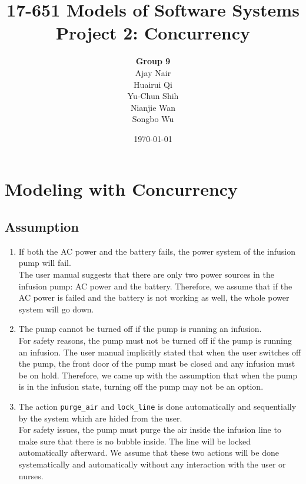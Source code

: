 \documentclass[titlepage]{article}
\begin{document}
\title{17-651 Models of Software Systems\\[1ex] Project 2: Concurrency}
\author{
{\Large\textbf{Group 9}}\\[3ex]
Ajay Nair\\[1ex] Huairui Qi\\[1ex] Yu-Chun Shih\\[1ex] Nianjie Wan\\[1ex]Songbo Wu}
\date{\today}
\maketitle

\section{Modeling with Concurrency}

    \subsection{Assumption}
    \begin{enumerate}
        \item If both the AC power and the battery fails, the power system of the infusion pump will fail.\\
        The user manual suggests that there are only two power sources in the infusion pump: AC power and the battery. Therefore, we assume that if the AC power is failed and the battery is not working as well, the whole power system will go down.
        \item The pump cannot be turned off if the pump is running an infusion.\\
        For safety reasons, the pump must not be turned off if the pump is running an infusion. The user manual implicitly stated that when the user switches off the pump, the front door of the pump must be closed and any infusion must be on hold. Therefore, we came up with the assumption that when the pump is in the infusion state, turning off the pump may not be an option.
        \item The action \texttt{purge\_air} and \texttt{lock\_line} is done automatically and sequentially by the system which are hided from the user.\\
        For safety issues, the pump must purge the air inside the infusion line to make sure that there is no bubble inside. The line will be locked automatically afterward. We assume that these two actions will be done systematically and automatically without any interaction with the user or nurses.
    \end{enumerate}
    
\end{document}
